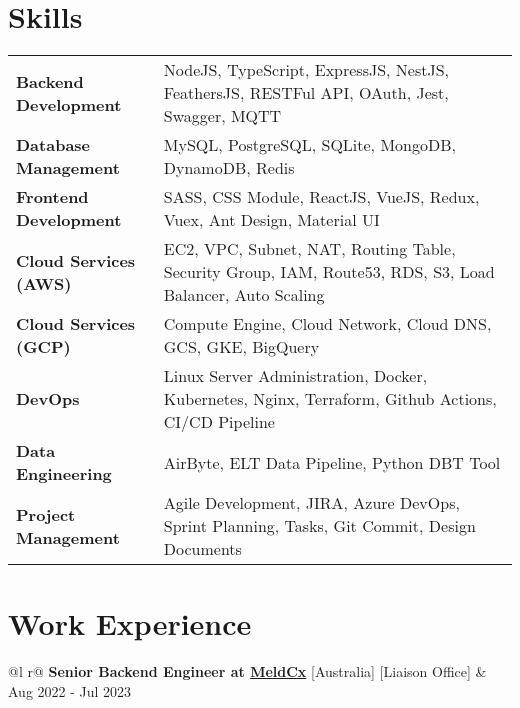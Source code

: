 \documentclass {article}
\begin{document}
\section{Skills}
\begin{tabularx}{\linewidth}{@{}l X@{}}
  \textbf{Backend Development} & NodeJS, TypeScript, ExpressJS, NestJS, FeathersJS, RESTFul API, OAuth, Jest, Swagger, MQTT\\
  \textbf{Database Management} & MySQL, PostgreSQL, SQLite, MongoDB, DynamoDB, Redis\\ 
  \textbf{Frontend Development} & SASS, CSS Module, ReactJS, VueJS, Redux, Vuex, Ant Design, Material UI\\ 
  \textbf{Cloud Services (AWS)} & EC2, VPC, Subnet, NAT, Routing Table, Security Group, IAM, Route53, RDS, S3, Load Balancer, Auto Scaling\\ 
  \textbf{Cloud Services (GCP)} & Compute Engine, Cloud Network, Cloud DNS, GCS, GKE, BigQuery\\
  \textbf{DevOps} & Linux Server Administration, Docker, Kubernetes, Nginx,  Terraform, Github Actions, CI/CD Pipeline\\
  \textbf{Data Engineering} & AirByte, ELT Data Pipeline, Python DBT Tool\\
  \textbf{Project Management} & Agile Development, JIRA, Azure DevOps, Sprint Planning, Tasks, Git Commit, Design Documents\\
\end{tabularx}

\section{Work Experience}

\begin{tabularx}{\linewidth}{ @{}l r@{} }
\textbf{Senior Backend Engineer at \href{https://www.meldcx.com/}{MeldCx}} [Australia] [Liaison Office] & \hfill Aug 2022 - Jul 2023 \\[3.75pt]
\end{tabularx}
\end{document}
